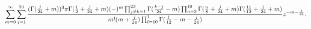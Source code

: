 \begin{equation}
\label{eq:sol12largez}
\sum_{m=0}^\infty\sum_{j=1}^{23}
{(\Gamma({j\over24}+m))^3\pi\Gamma({1\over2}+{j\over24}+m)
(-)^m\prod_{j\neq k=1}^{23}
\Gamma({k-j\over24}-m)\prod_{n=3}^{10}
\Gamma({n\over8}+{j\over24}+m)\Gamma({11\over12}+{j\over24}+m)
\over m!(m+{j\over24})
\prod_{l=10}^1\Gamma({l\over12}-m-{j\over24})}z^{-m-{j\over24}}.
\end{equation}

